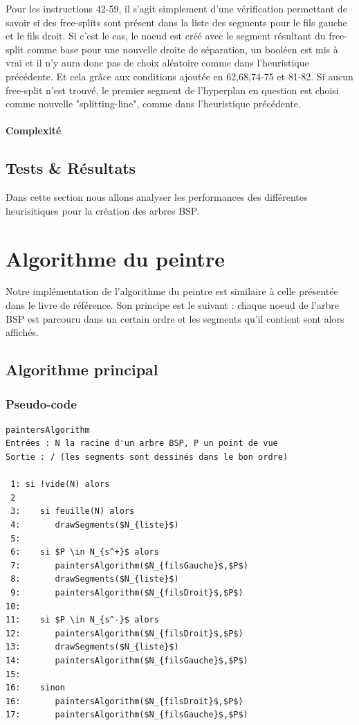 \documentclass[11pt,a4paper]{article}
\begin{document}
Pour les instructions 42-59, il s'agit simplement d'une vérification permettant de savoir si des free-splits sont présent dans la liste des segments pour le fils gauche et le fils droit. Si c'est le cas, le noeud est créé avec le segment résultant du free-split comme base pour une nouvelle droite de séparation, un booléen est mis à vrai et il n'y aura donc pas de choix aléatoire comme dans l'heuristique précédente. Et cela grâce aux conditions ajoutée en 62,68,74-75 et 81-82. Si aucun free-split n'est trouvé, le premier segment de l'hyperplan en question est choisi comme nouvelle "splitting-line", comme dans l'heuristique précédente. 

\paragraph{Complexité}

\subsection{Tests \& Résultats}

Dans cette section nous allons analyser les performances des différentes heurisitiques pour la création des arbres BSP. \\

\section{Algorithme du peintre}

Notre implémentation de l'algorithme du peintre est similaire à celle présentée dans le livre de référence. Son principe est le suivant : chaque noeud de l'arbre BSP est parcouru dans un certain ordre et les segments qu'il contient sont alors affichés.

\subsection{Algorithme principal}
\subsubsection{Pseudo-code}
\begin{lstlisting}
paintersAlgorithm
Entrées : N la racine d'un arbre BSP, P un point de vue
Sortie : / (les segments sont dessinés dans le bon ordre)

 1: si !vide(N) alors
 2
 3:    si feuille(N) alors
 4:       drawSegments($N_{liste}$)
 5:
 6:    si $P \in N_{s^+}$ alors
 7:       paintersAlgorithm($N_{filsGauche}$,$P$)
 8:       drawSegments($N_{liste}$)
 9:       paintersAlgorithm($N_{filsDroit}$,$P$)
10:
11:    si $P \in N_{s^-}$ alors
12:       paintersAlgorithm($N_{filsDroit}$,$P$)
13:       drawSegments($N_{liste}$)
14:       paintersAlgorithm($N_{filsGauche}$,$P$)
15:
16:    sinon
16:       paintersAlgorithm($N_{filsDroit}$,$P$)
17:       paintersAlgorithm($N_{filsGauche}$,$P$)
\end{lstlisting}
\end{document}
